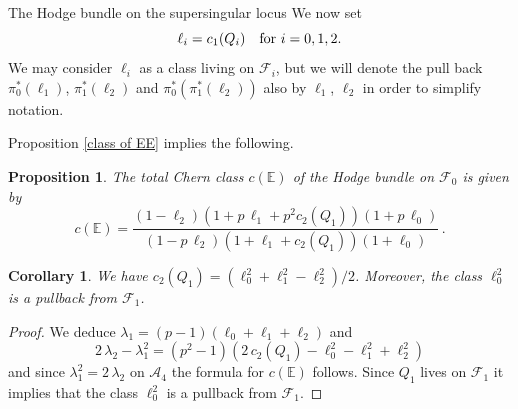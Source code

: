 \documentclass[11pt]{amsart}
\numberwithin{equation}{section}
\newcommand{\EE}{\mathbb E}
\newtheorem{proposition}[theorem]{Proposition}
\newtheorem{corollary}[theorem]{Corollary}
\theoremstyle{definition}
\theoremstyle{remark}
\begin{document}
\begin{section}{The Hodge bundle on the supersingular locus}
We now set
$$
\ell_i= c_1(Q_i) \quad \text{\rm for $i=0,1,2$.}
$$
We may consider $\ell_i$
as a class living on $\mathcal{F}_i$, but we will denote the pull back $\pi_0^*(\ell_1)$, $\pi_1^*(\ell_2)$ and $\pi_0^*(\pi_1^*(\ell_2))$ also by $\ell_1$, $\ell_2$
in order to simplify notation.

Proposition \ref{class of EE} implies the following.

\begin{proposition}\label{Chern-Hodge-bundle}
The total Chern class $c({\EE})$
of the Hodge bundle on $\mathcal{F}_0$ is given by
$$
c({\EE})=
\frac{(1-\ell_2)(1+p\, \ell_1+p^2c_2(Q_1))(1+p\, \ell_0)}{(1-p\, \ell_2)(1+\ell_1+c_2(Q_1))(1+\ell_0)}\, .
$$
\end{proposition}
\begin{corollary}\label{Cor-c2Q1}%
We have $c_2(Q_1)= (\ell_0^2+\ell_1^2-\ell_2^2)/2$. Moreover,
the class $\ell_0^2$ is a pullback from $\mathcal{F}_1$.
\end{corollary}\label{c2Q1}
\begin{proof}
We deduce
$\lambda_1=(p-1)(\ell_0+\ell_1+\ell_2)$
and
$$
2\,\lambda_2 -\lambda_1^2 =(p^2-1)(2\, c_2(Q_1)-\ell_0^2-\ell_1^2+\ell_2^2)
$$
and since $\lambda_1^2=2\, \lambda_2$ on $\mathcal{A}_4$ the formula for
$c({\EE})$ follows.
Since $Q_1$ lives on $\mathcal{F}_1$ it implies
that the class $\ell_0^2$ is a pullback from $\mathcal{F}_1$.
\end{proof}
\end{section}
\end{document}
